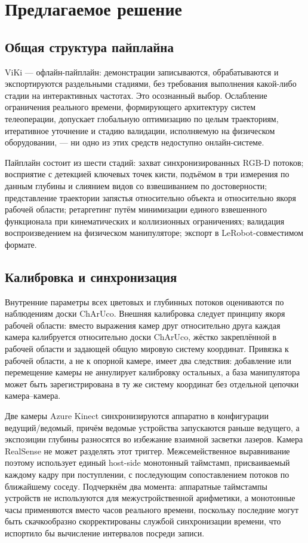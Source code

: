 \documentclass[12pt, a4paper, oneside]{report}
\begin{document}
\chapter{Предлагаемое решение}

\section{Общая структура пайплайна}

ViKi --- офлайн-пайплайн: демонстрации записываются, обрабатываются и
экспортируются раздельными стадиями, без требования выполнения какой-либо стадии
на интерактивных частотах. Это осознанный выбор. Ослабление ограничения
реального времени, формирующего архитектуру систем телеоперации, допускает
глобальную оптимизацию по целым траекториям, итеративное уточнение и стадию
валидации, исполняемую на физическом оборудовании, --- ни одно из этих средств
недоступно онлайн-системе.

Пайплайн состоит из шести стадий: захват синхронизированных RGB-D потоков;
восприятие с детекцией ключевых точек кисти, подъёмом в три измерения по данным
глубины и слиянием видов со взвешиванием по достоверности; представление
траектории запястья относительно объекта и относительно якоря рабочей области;
ретаргетинг путём минимизации единого взвешенного функционала при кинематических
и коллизионных ограничениях; валидация воспроизведением на физическом
манипуляторе; экспорт в LeRobot-совместимом формате.

\section{Калибровка и синхронизация}

Внутренние параметры всех цветовых и глубинных потоков оцениваются по
наблюдениям доски ChArUco. Внешняя калибровка следует принципу якоря рабочей
области: вместо выражения камер друг относительно друга каждая камера
калибруется относительно доски ChArUco, жёстко закреплённой в рабочей области и
задающей общую мировую систему координат. Привязка к рабочей области, а не к
опорной камере, имеет два следствия: добавление или перемещение камеры не
аннулирует калибровку остальных, а база манипулятора может быть
зарегистрирована в ту же систему координат без отдельной цепочки
камера--камера.

Две камеры Azure Kinect синхронизируются аппаратно в конфигурации
ведущий/ведомый, причём ведомые устройства запускаются раньше ведущего, а
экспозиции глубины разносятся во избежание взаимной засветки лазеров. Камера
RealSense не может разделять этот триггер. Межсемейственное выравнивание
поэтому использует единый host-side монотонный таймстамп, присваиваемый каждому
кадру при поступлении, с последующим сопоставлением потоков по ближайшему
соседу. Подчеркнём два момента: аппаратные таймстампы устройств не используются
для межустройственной арифметики, а монотонные часы применяются вместо часов
реального времени, поскольку последние могут быть скачкообразно скорректированы
службой синхронизации времени, что испортило бы вычисление интервалов посреди
записи.
\end{document}
